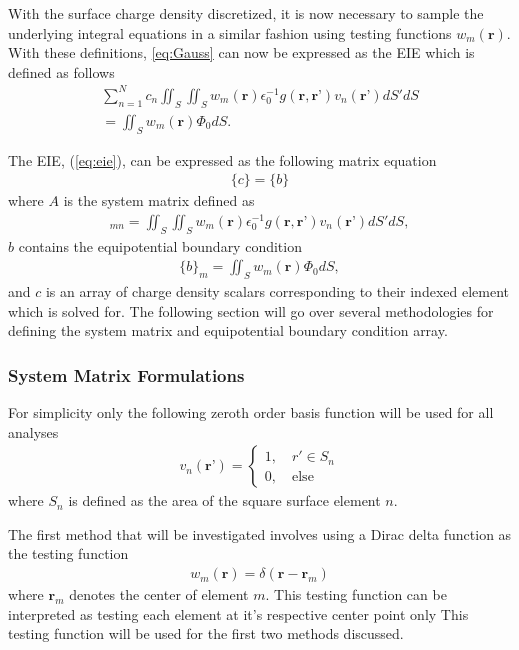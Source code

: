 With the surface charge density discretized, it is now necessary to sample the underlying integral equations in a similar fashion using testing functions $w_m(\textbf{r})$. With these definitions, \ref{eq:Gauss} can now be expressed as the EIE which is defined as follows
\begin{multline}
    \sum_{n=1}^{N}c_n\iint_S\iint_Sw_m(\textbf{r})\epsilon_0^{-1}g(\textbf{r},\textbf{r'})v_n(\textbf{r'})dS'dS \\ =\iint_Sw_m(\textbf{r})\Phi_0dS.
    \label{eq:eie}
\end{multline}

The EIE, (\ref{eq:eie}), can be expressed as the following matrix equation
\begin{align}
    [A]\{c\}=\{b\}
\end{align}
where $A$ is the system matrix defined as
\begin{align}
    [A]_{mn}=\iint_S\iint_Sw_m(\textbf{r})\epsilon_0^{-1}g(\textbf{r},\textbf{r'})v_n(\textbf{r'})dS'dS,
    \label{eq:a}
\end{align}
$b$ contains the equipotential boundary condition
\begin{align}
    \{b\}_m=\iint_Sw_m(\textbf{r})\Phi_0dS,
    \label{eq:b}
\end{align}
and ${c}$ is an array of charge density scalars corresponding to their indexed element which is solved for. The following section will go over several methodologies for defining the system matrix and equipotential boundary condition array.

\subsubsection{System Matrix Formulations}
\label{subsub:mat-form}

For simplicity only the following zeroth order basis function will be used for all analyses
\begin{align}
    v_n(\textbf{r'})=\begin{cases}
        1,\quad r'\in S_n\\
        0,\quad \mathrm{else}
    \end{cases}
\end{align}
where $S_n$ is defined as the area of the square surface element $n$.

The first method that will be investigated involves using a Dirac delta function as the testing function
\begin{align}
    w_m(\textbf{r})=\delta (\textbf{r}-\textbf{r}_m)
    \label{eq:Dirac}
\end{align} 
where $\textbf{r}_m$ denotes the center of element $m$. This testing function can be interpreted as testing each element at it's respective center point only \cite{rothlecnotes} This testing function will be used for the first two methods discussed.

